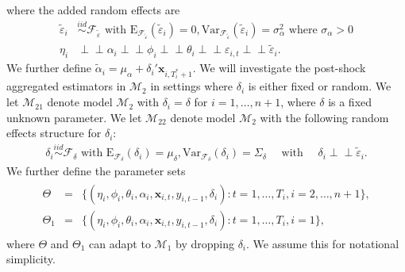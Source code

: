 \documentclass[11pt]{article}
\def\mbf#1{\mathbf{#1}} %
\newcommand{\simiid}{\stackrel{iid}{\sim}} %
\def\where{\text{ where }} %
\newcommand{\indep}{\perp \!\!\! \perp } %
\def\mrm#1{\mathrm{#1}} %
\def\t#1{\tilde{#1}} %
\def\mc#1{\mathcal{#1}} %
\theoremstyle{definition}
\begin{document}
 where the added random effects are
\begin{align*}
\t{\varepsilon}_{i} &\simiid  \mc{F}_{\t{\varepsilon}} \text{ with }\mrm{E}_{\mc{F}_{\t{\varepsilon}}}(\t{\varepsilon}_{i})=0, \mrm{Var}_{\mc{F}_{\t{\varepsilon}}}(\t{\varepsilon}_{i})=\sigma^2_{\alpha} \where \sigma_{\alpha}>0\\
\eta_i &\indep  \alpha_i \indep \phi_i \indep \theta_i \indep \varepsilon_{i,t} \indep \t{\varepsilon}_{i}.
\end{align*} 
We further define 
$\tilde{\alpha}_i=\mu_{\alpha}+\delta_i'\mbf{x}_{i, T_i^*+1}$. 
We will investigate the post-shock aggregated estimators in $\mc{M}_2$ 
in settings where $\delta_i$ is either fixed or random. 
We let $\mc{M}_{21}$ denote model $\mc{M}_{2}$ with $\delta_i = \delta$ for $i= 1, \ldots, n+1$, 
where $\delta$ is a  fixed unknown parameter.
We let $\mc{M}_{22}$ denote model $\mc{M}_{2}$ with the following random effects 
structure for $\delta_i$:
\begin{align*}
\delta_i\simiid  \mc{F}_{\delta} \text{ with }\mrm{E}_{\mc{F}_{\delta}}(\delta_i)=\mu_{\delta}, \mrm{Var}_{\mc{F}_{\delta}}(\delta_i)=\Sigma_\delta 
   \quad \text{ with } \quad  \delta_i  \indep \t{\varepsilon}_{i}.
\end{align*}
We further define the parameter sets
\begin{align}
  \begin{array}{lll}
     \Theta &= &\{(\eta_i, \phi_i, \theta_i, \alpha_i, \mbf{x}_{i,t}, y_{i,t-1}, \delta_i)\colon t= 1, \ldots, T_i, i = 2, \ldots, n +1\},\\
    \Theta_1 &= &\{(\eta_i, \phi_i, \theta_i, \alpha_i, \mbf{x}_{i,t}, y_{i,t-1}, \delta_i)\colon t= 1, \ldots, T_i, i = 1\},\label{parameter}
  \end{array}
\end{align}
where $\Theta$ and $\Theta_1$ can adapt to $\mc{M}_1$ by dropping $\delta_i$. We assume this for notational simplicity.
\end{document}
